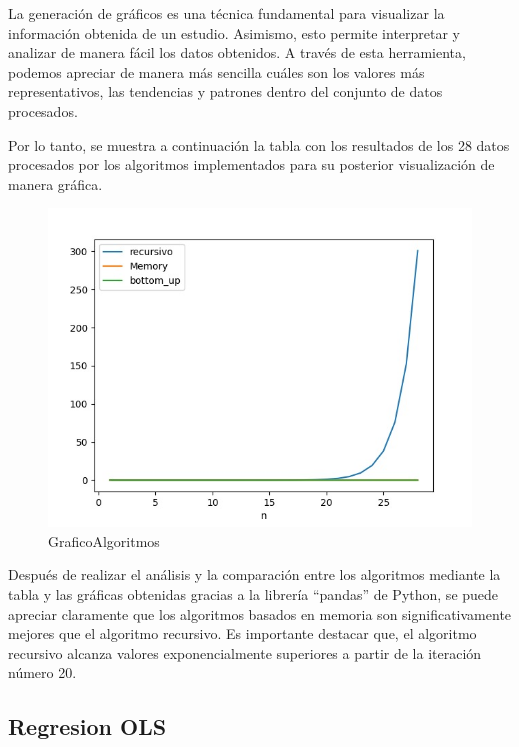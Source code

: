\documentclass[11pt]{article}
\begin{document}
La generación de gráficos es una técnica fundamental para visualizar la
información obtenida de un estudio. Asimismo, esto permite interpretar y
analizar de manera fácil los datos obtenidos. A través de esta
herramienta, podemos apreciar de manera más sencilla cuáles son los
valores más representativos, las tendencias y patrones dentro del
conjunto de datos procesados.

Por lo tanto, se muestra a continuación la tabla con los resultados de
los 28 datos procesados por los algoritmos implementados para su
posterior visualización de manera gráfica.

\begin{figure}
\centering
\includegraphics{GraficoAlgoritmos.jpg}
\caption{GraficoAlgoritmos}
\end{figure}

Después de realizar el análisis y la comparación entre los algoritmos
mediante la tabla y las gráficas obtenidas gracias a la librería
``pandas'' de Python, se puede apreciar claramente que los algoritmos
basados en memoria son significativamente mejores que el algoritmo
recursivo. Es importante destacar que, el algoritmo recursivo alcanza
valores exponencialmente superiores a partir de la iteración número 20.

\hypertarget{regresion-ols}{%
\subsection{Regresion OLS}\label{regresion-ols}}
\end{document}
